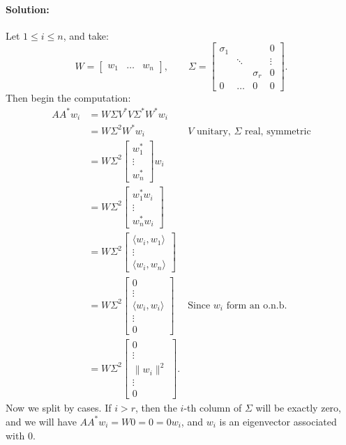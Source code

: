 \documentclass{article}
\begin{document}
\begin{enumerate}
    \paragraph{Solution: }Let $1\leq i \leq n$, and take:
    \[ W= \begin{bmatrix} w_1&\dots&w_n \end{bmatrix},\quad \quad 
    \Sigma=
    \begin{bmatrix} \sigma_{1}&&&0 \\
    &\ddots &&\vdots \\
    &&\sigma_r&0 \\
    0&\dots&0&0
    \end{bmatrix} .\] 
    Then begin the computation:
    \begin{align*}
        A A^* w_i&= W\Sigma V^* V \Sigma^* W^* w_i \\
                 &= W\Sigma^2W^*w_i &\text{$V$ unitary, $\Sigma$ real, symmetric} \\
                 &= W\Sigma^2\begin{bmatrix} w_1^* \\\vdots \\ w_n^*  \end{bmatrix}w_i  \\
                 &= W\Sigma^2\begin{bmatrix} w_1^*w_i \\\vdots \\ w_n^* w_i \end{bmatrix}\\
                 &= W\Sigma^2\begin{bmatrix} \langle w_i,w_1 \rangle \\\vdots \\ \langle w_i,w_n \rangle \end{bmatrix}\\
                 &= W\Sigma^2\begin{bmatrix} 0\\ \vdots\\ \langle w_i,w_i \rangle\\ \vdots \\ 0 \end{bmatrix}&\text{Since $w_i$ form an o.n.b.}\\
                 &= W\Sigma^2\begin{bmatrix} 0\\ \vdots\\ \|w_i\|^2\\ \vdots \\ 0 \end{bmatrix}
    .\end{align*}
    Now we split by cases. If $i>r$, then the  $i$-th column of $\Sigma$ will be exactly zero, and we will have $A A^* w_i=W0=0=0w_i$, and $w_i$ is an eigenvector associated with $0$.


\end{enumerate}
\end{document}
